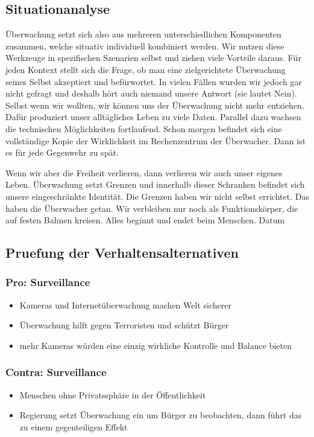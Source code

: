	\subsection{Situationanalyse}
	Überwachung setzt sich also aus mehreren unterschiedlichen Komponenten zusammen, welche situativ individuell kombiniert werden. Wir nutzen diese Werkzeuge in spezifischen Szenarien selbst und ziehen viele Vorteile daraus. Für jeden Kontext stellt sich die Frage, ob man eine zielgerichtete Überwachung seines Selbst akzeptiert und befürwortet. In vielen Fällen wurden wir jedoch gar nicht gefragt und deshalb hört auch niemand unsere Antwort (sie lautet Nein). Selbst wenn wir wollten, wir können uns der Überwachung nicht mehr entziehen. Dafür produziert unser alltägliches Leben zu viele Daten. Parallel dazu wachsen die technischen Möglichkeiten fortlaufend. Schon morgen befindet sich eine vollständige Kopie der Wirklichkeit im Rechenzentrum der Überwacher. Dann ist es für jede Gegenwehr zu spät.
	
	Wenn wir aber die Freiheit verlieren, dann verlieren wir auch unser eigenes Leben. Überwachung setzt Grenzen und innerhalb dieser Schranken befindet sich unsere eingeschränkte Identität. Die Grenzen haben wir nicht selbst errichtet. Das haben die Überwacher getan. Wir verbleiben nur noch als Funktionskörper, die auf festen Bahnen kreisen. Alles beginnt und endet beim Menschen.
	Datum
	\subsection{Pruefung der Verhaltensalternativen}
		\subsubsection{Pro: Surveillance}
			\begin{itemize}
				\item Kameras und Internetüberwachung machen Welt sicherer
				\item Überwachung hilft gegen Terroristen und schützt Bürger
				\item mehr Kameras würden eine einzig wirkliche Kontrolle und Balance bieten
			\end{itemize}
		\subsubsection{Contra: Surveillance}
			\begin{itemize}
				\item Menschen ohne Privatssphäre in der Öffentlichkeit
				\item Regierung setzt Überwachung ein um Bürger zu beobachten, dann führt das zu einem gegenteiligen Effekt
			\end{itemize}

